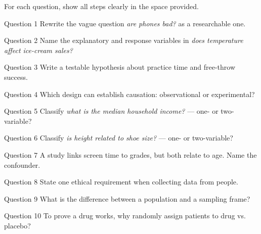 \documentclass[11pt]{article}
\begin{document}
\clearpage
{}
For each question, show all steps clearly in the space provided.

\begin{qbox}{Question 1}
Rewrite the vague question \emph{are phones bad?} as a researchable one.\workspace{2.4cm}
\end{qbox}

\begin{qbox}{Question 2}
Name the explanatory and response variables in \emph{does temperature affect ice-cream sales?}\workspace{2.4cm}
\end{qbox}

\begin{qbox}{Question 3}
Write a testable hypothesis about practice time and free-throw success.\workspace{2.4cm}
\end{qbox}

\begin{qbox}{Question 4}
Which design can establish causation: observational or experimental?\workspace{2.4cm}
\end{qbox}

\begin{qbox}{Question 5}
Classify \emph{what is the median household income?} --- one- or two-variable?\workspace{2.4cm}
\end{qbox}

\begin{qbox}{Question 6}
Classify \emph{is height related to shoe size?} --- one- or two-variable?\workspace{2.4cm}
\end{qbox}

\begin{qbox}{Question 7}
A study links screen time to grades, but both relate to age. Name the confounder.\workspace{2.4cm}
\end{qbox}

\begin{qbox}{Question 8}
State one ethical requirement when collecting data from people.\workspace{2.4cm}
\end{qbox}

\begin{qbox}{Question 9}
What is the difference between a population and a sampling frame?\workspace{2.4cm}
\end{qbox}

\begin{qbox}{Question 10}
To prove a drug works, why randomly assign patients to drug vs. placebo?\workspace{2.4cm}
\end{qbox}
\end{document}
